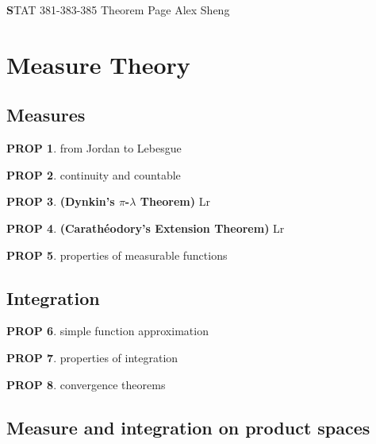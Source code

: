 \documentclass[hidelinks,11pt]{article}
\theoremstyle{definition}
\theoremstyle{dotless}
\newtheorem{prop}{PROP}[section]
\theoremstyle{remark}
\DeclareMathOperator{\1}{\mathbf{1}}
\begin{document}
\begin{center}
{\Large\textbf STAT 381-383-385 \hspace{0.1cm} Theorem Page}\medbreak
\large{Alex Sheng}
\end{center}

\vspace{0.2 cm}
\tableofcontents

\newpage
\section{Measure Theory}

\subsection{Measures}

\begin{prop}
from Jordan to Lebesgue
\end{prop}

\begin{prop}
continuity and countable
\end{prop}

\begin{prop}\textup{\textbf{(Dynkin's $\pi$-$\lambda$ Theorem)}} Lr
\end{prop}

\begin{prop}\textup{\textbf{(Carathéodory's Extension Theorem)}} Lr
\end{prop}

\begin{prop}
properties of measurable functions
\end{prop}

\subsection{Integration}

\begin{prop}
simple function approximation
\end{prop}

\begin{prop}
properties of integration
\end{prop}

\begin{prop}
convergence theorems
\end{prop}

\subsection{Measure and integration on product spaces}
\end{document}
